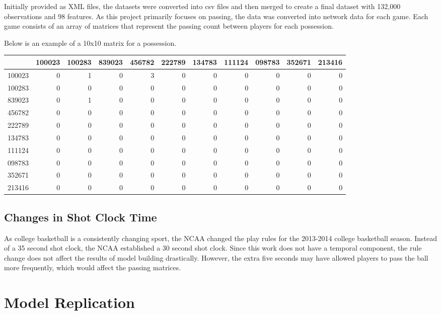 \documentclass[12pt,twoside]{dukestatscithesis}
\theoremstyle{definition}
\theoremstyle{definition}
\theoremstyle{definition}
\theoremstyle{remark}
\begin{document}
Initially provided as XML files, the datasets were converted into csv
files and then merged to create a final dataset with 132,000
observations and 98 features. As this project primarily focuses on
passing, the data was converted into network data for each game. Each
game consists of an array of matrices that represent the passing count
between players for each possession.

Below is an example of a 10x10 matrix for a possession.
\begin{tabular}{l|r|r|r|r|r|r|r|r|r|r}
\hline
  & 100023 & 100283 & 839023 & 456782 & 222789 & 134783 & 111124 & 098783 & 352671 & 213416\\
\hline
100023 & 0 & 1 & 0 & 3 & 0 & 0 & 0 & 0 & 0 & 0\\
\hline
100283 & 0 & 0 & 0 & 0 & 0 & 0 & 0 & 0 & 0 & 0\\
\hline
839023 & 0 & 1 & 0 & 0 & 0 & 0 & 0 & 0 & 0 & 0\\
\hline
456782 & 0 & 0 & 0 & 0 & 0 & 0 & 0 & 0 & 0 & 0\\
\hline
222789 & 0 & 0 & 0 & 0 & 0 & 0 & 0 & 0 & 0 & 0\\
\hline
134783 & 0 & 0 & 0 & 0 & 0 & 0 & 0 & 0 & 0 & 0\\
\hline
111124 & 0 & 0 & 0 & 0 & 0 & 0 & 0 & 0 & 0 & 0\\
\hline
098783 & 0 & 0 & 0 & 0 & 0 & 0 & 0 & 0 & 0 & 0\\
\hline
352671 & 0 & 0 & 0 & 0 & 0 & 0 & 0 & 0 & 0 & 0\\
\hline
213416 & 0 & 0 & 0 & 0 & 0 & 0 & 0 & 0 & 0 & 0\\
\hline
\end{tabular}
\section{Changes in Shot Clock Time}\label{changes-in-shot-clock-time}

As college basketball is a consistently changing sport, the NCAA changed
the play rules for the 2013-2014 college basketball season. Instead of a
35 second shot clock, the NCAA established a 30 second shot clock. Since
this work does not have a temporal component, the rule change does not
affect the results of model building drastically. However, the extra
five seconds may have allowed players to pass the ball more frequently,
which would affect the passing matrices.

\chapter{Model Replication}\label{model-replication}
\end{document}
